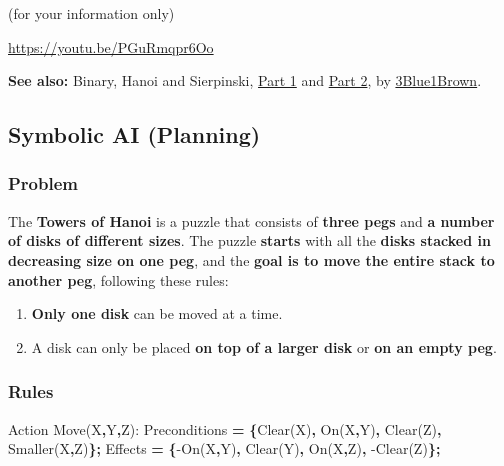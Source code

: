 \documentclass[
  letterpaper,
  DIV=11,
  numbers=noendperiod]{scrartcl}
\newenvironment{Shaded}{\begin{snugshade}}{\end{snugshade}}
\newcommand{\DataTypeTok}[1]{\textcolor[rgb]{0.68,0.00,0.00}{#1}}
\newcommand{\FunctionTok}[1]{\textcolor[rgb]{0.28,0.35,0.67}{#1}}
\newcommand{\KeywordTok}[1]{\textcolor[rgb]{0.00,0.23,0.31}{\textbf{#1}}}
\newcommand{\NormalTok}[1]{\textcolor[rgb]{0.00,0.23,0.31}{#1}}
\providecommand{\tightlist}{%
  \setlength{\itemsep}{0pt}\setlength{\parskip}{0pt}}
\begin{document}
(for your information only)

\url{https://youtu.be/PGuRmqpr6Oo}

\textbf{See also:} Binary, Hanoi and Sierpinski,
\href{https://www.youtube.com/watch?v=2SUvWfNJSsM}{Part 1} and
\href{https://www.youtube.com/watch?v=bdMfjfT0lKk}{Part 2}, by
\href{https://www.youtube.com/@3blue1brown}{3Blue1Brown}.

\subsection{Symbolic AI (Planning)}\label{symbolic-ai-planning}

\subsubsection{Problem}\label{problem}

The \textbf{Towers of Hanoi} is a puzzle that consists of \textbf{three
pegs} and \textbf{a number of disks of different sizes}. The puzzle
\textbf{starts} with all the \textbf{disks stacked in decreasing size on
one peg}, and the \textbf{goal is to move the entire stack to another
peg}, following these rules:

\begin{enumerate}
\def\labelenumi{\arabic{enumi}.}
\tightlist
\item
  \textbf{Only one disk} can be moved at a time.
\item
  A disk can only be placed \textbf{on top of a larger disk} or
  \textbf{on an empty peg}.
\end{enumerate}

\subsubsection{Rules}\label{rules}

\begin{Shaded}
\begin{Highlighting}[]
\DataTypeTok{Action} \DataTypeTok{Move}\NormalTok{(}\DataTypeTok{X}\KeywordTok{,}\DataTypeTok{Y}\KeywordTok{,}\DataTypeTok{Z}\NormalTok{)}\FunctionTok{:}
    \DataTypeTok{Preconditions} \KeywordTok{=} \KeywordTok{\{}\DataTypeTok{Clear}\NormalTok{(}\DataTypeTok{X}\NormalTok{)}\KeywordTok{,} \DataTypeTok{On}\NormalTok{(}\DataTypeTok{X}\KeywordTok{,}\DataTypeTok{Y}\NormalTok{)}\KeywordTok{,} \DataTypeTok{Clear}\NormalTok{(}\DataTypeTok{Z}\NormalTok{)}\KeywordTok{,} \DataTypeTok{Smaller}\NormalTok{(}\DataTypeTok{X}\KeywordTok{,}\DataTypeTok{Z}\NormalTok{)}\KeywordTok{\};}
    \DataTypeTok{Effects} \KeywordTok{=} \KeywordTok{\{}\FunctionTok{{-}}\DataTypeTok{On}\NormalTok{(}\DataTypeTok{X}\KeywordTok{,}\DataTypeTok{Y}\NormalTok{)}\KeywordTok{,} \DataTypeTok{Clear}\NormalTok{(}\DataTypeTok{Y}\NormalTok{)}\KeywordTok{,} \DataTypeTok{On}\NormalTok{(}\DataTypeTok{X}\KeywordTok{,}\DataTypeTok{Z}\NormalTok{)}\KeywordTok{,} \FunctionTok{{-}}\DataTypeTok{Clear}\NormalTok{(}\DataTypeTok{Z}\NormalTok{)}\KeywordTok{\};}
\end{Highlighting}
\end{Shaded}
\end{document}
